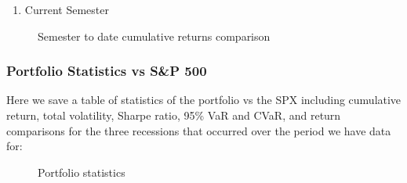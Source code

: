 \documentclass[]{article}
\providecommand{\tightlist}{%
  \setlength{\itemsep}{2pt}\setlength{\parskip}{0pt}}
\begin{document}
\begin{enumerate}
\def\labelenumi{\arabic{enumi}.}
\setcounter{enumi}{2}
\tightlist
\item
  Current Semester
\end{enumerate}

\begin{figure}[H]
\centering
{}
\caption{Semester to date cumulative returns comparison}
\end{figure}

\hypertarget{portfolio-statistics-vs-sp-500}{%
\subsubsection{Portfolio Statistics vs S\&P
500}\label{portfolio-statistics-vs-sp-500}}

Here we save a table of statistics of the portfolio vs the SPX including
cumulative return, total volatility, Sharpe ratio, 95\% VaR and CVaR,
and return comparisons for the three recessions that occurred over the
period we have data for:

\begin{figure}[H]
\centering
{}
\caption{Portfolio statistics}
\end{figure}
\end{document}
